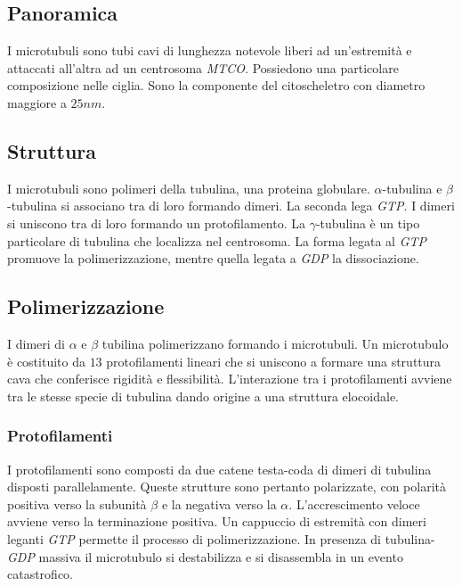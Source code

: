 	\subsection{Panoramica}
	I microtubuli sono tubi cavi di lunghezza notevole liberi ad un'estremit\`a e attaccati all'altra ad un centrosoma \emph{MTCO}.
	Possiedono una particolare composizione nelle ciglia.
	Sono la componente del citoscheletro con diametro maggiore a $25nm$.

	\subsection{Struttura}
	I microtubuli sono polimeri della tubulina, una proteina globulare.
	$\alpha$-tubulina e $\beta$-tubulina si associano tra di loro formando dimeri.
	La seconda lega \emph{GTP}.
	I dimeri si uniscono tra di loro formando un protofilamento.
	La $\gamma$-tubulina \`e un tipo particolare di tubulina che localizza nel centrosoma.
	La forma legata al \emph{GTP} promuove la polimerizzazione, mentre quella legata a \emph{GDP} la dissociazione.

	\subsection{Polimerizzazione}
	I dimeri di $\alpha$ e $\beta$ tubilina polimerizzano formando i microtubuli.
	Un microtubulo \`e costituito da $13$ protofilamenti lineari che si uniscono a formare una struttura cava che conferisce rigidit\`a e flessibilit\`a.
	L'interazione tra i protofilamenti avviene tra le stesse specie di tubulina dando origine a una struttura elocoidale.

		\subsubsection{Protofilamenti}
		I protofilamenti sono composti da due catene testa-coda di dimeri di tubulina disposti parallelamente.
		Queste strutture sono pertanto polarizzate, con polarit\`a positiva verso la subunit\`a $\beta$ e la negativa verso la $\alpha$.
		L'accrescimento veloce avviene verso la terminazione positiva.
		Un cappuccio di estremit\`a con dimeri leganti \emph{GTP} permette il processo di polimerizzazione.
		In presenza di tubulina-\emph{GDP} massiva il microtubulo si destabilizza e si disassembla in un evento catastrofico.

